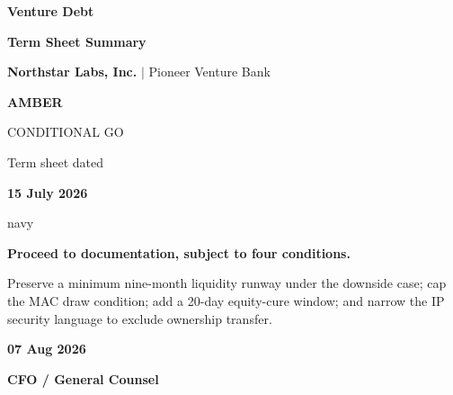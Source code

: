\documentclass[10pt,letterpaper]{article}
\begin{document}
\fontsize{9}{10.5}\selectfont

\thispagestyle{fancy}

\begin{minipage}[t]{0.72\textwidth}
  \vspace{4pt}

  {\color{navy}\fontsize{26}{29}\selectfont\bfseries Venture Debt\par}
  {\color{navy}\fontsize{26}{29}\selectfont\bfseries Term Sheet Summary}
  \vspace{6pt}

  {\large\color{ink}\textbf{Northstar Labs, Inc.} \textcolor{muted}{$\mid$} Pioneer Venture Bank}
\end{minipage}
\hfill
\begin{minipage}[t]{0.24\textwidth}
  \raggedleft
  \colorbox{paleamber}{\parbox{0.84\linewidth}{\centering\color{amber}\bfseries AMBER\par\scriptsize CONDITIONAL GO}}
  \vspace{7pt}

  {\scriptsize\color{muted} Term sheet dated\par}
  {\small\bfseries\color{ink} 15 July 2026}
\end{minipage}

\vspace{9pt}
\begin{callout}{navy}
  \color{white}
  \begin{minipage}[t]{0.73\linewidth}
    \par\vspace{2pt}
    {\large\bfseries Proceed to documentation, subject to four conditions.}\par\vspace{3pt}
    \small Preserve a minimum nine-month liquidity runway under the downside case; cap the MAC draw condition; add a 20-day equity-cure window; and narrow the IP security language to exclude ownership transfer.
  \end{minipage}
  \hfill
  \begin{minipage}[t]{0.21\linewidth}
    \color{white}\raggedleft
    \par
    {\large\bfseries 07 Aug 2026}\par\vspace{4pt}
    \par
    {\small\bfseries CFO / General Counsel}
  \end{minipage}
\end{callout}
\end{document}
